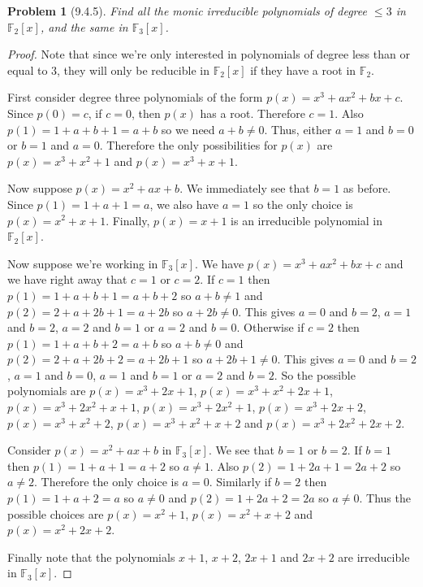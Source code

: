 \documentclass{article}
\newtheorem{problem}{Problem}
\begin{document}
\begin{problem}[9.4.5]
\label{finite}
Find all the monic irreducible polynomials of degree $\leq 3$ in $\mathbb{F}_2[x]$, and the same in $\mathbb{F}_3[x]$.
\end{problem}
\begin{proof}
Note that since we're only interested in polynomials of degree less than or equal to $3$, they will only be reducible in $\mathbb{F}_2[x]$ if they have a root in $\mathbb{F}_2$.

First consider degree three polynomials of the form $p(x) = x^3 + ax^2 + bx + c$. Since $p(0) = c$, if $c = 0$, then $p(x)$ has a root. Therefore $c = 1$. Also $p(1) = 1 + a + b + 1 = a + b$ so we need $a + b \neq 0$. Thus, either $a = 1$ and $b = 0$ or $b = 1$ and $a = 0$. Therefore the only possibilities for $p(x)$ are $p(x) = x^3 + x^2 + 1$ and $p(x) = x^3 + x + 1$.

Now suppose $p(x) = x^2 + ax + b$. We immediately see that $b = 1$ as before. Since $p(1) = 1 + a + 1 = a$, we also have $a = 1$ so the only choice is $p(x) = x^2 + x + 1$. Finally, $p(x) = x + 1$ is an irreducible polynomial in $\mathbb{F}_2[x]$.

Now suppose we're working in $\mathbb{F}_3[x]$. We have $p(x) = x^3 + ax^2 + bx + c$ and we have right away that $c = 1$ or $c = 2$. If $c = 1$ then $p(1) = 1 + a + b + 1 = a + b + 2$ so $a + b \neq 1$ and $p(2) = 2 + a + 2b + 1 = a + 2b$ so $a + 2b \neq 0$. This gives $a = 0$ and $b = 2$, $a = 1$ and $b = 2$, $a = 2$ and $b = 1$ or $a = 2$ and $b = 0$. Otherwise if $c = 2$ then $p(1) = 1 + a + b + 2 = a + b$ so $a + b \neq 0$ and $p(2) = 2 + a + 2b + 2 = a + 2b + 1$ so $a + 2b + 1 \neq 0$. This gives $a = 0$ and $b = 2$, $a = 1$ and $b = 0$, $a = 1$ and $b = 1$ or $a = 2$ and $b = 2$. So the possible polynomials are $p(x) = x^3 + 2x + 1$, $p(x) = x^3 + x^2 + 2x + 1$, $p(x) = x^3 + 2x^2 + x + 1$, $p(x) = x^3 + 2x^2 + 1$, $p(x) = x^3 + 2x + 2$, $p(x) = x^3 + x^2 + 2$, $p(x) = x^3 + x^2 + x + 2$ and $p(x) = x^3 + 2x^2 + 2x + 2$.

Consider $p(x) = x^2 + ax + b$ in $\mathbb{F}_3[x]$. We see that $b = 1$ or $b = 2$. If $b = 1$ then $p(1) = 1 + a + 1 = a + 2$ so $a \neq 1$. Also $p(2) = 1 + 2a + 1 = 2a + 2$ so $a \neq 2$. Therefore the only choice is $a = 0$. Similarly if $b = 2$ then $p(1) = 1 + a + 2 = a$ so $a \neq 0$ and $p(2) = 1 + 2a + 2 = 2a$ so $a \neq 0$. Thus the possible choices are $p(x) = x^2 + 1$, $p(x) = x^2 + x + 2$ and $p(x) = x^2 + 2x + 2$.

Finally note that the polynomials $x + 1$, $x + 2$, $2x + 1$ and $2x + 2$ are irreducible in $\mathbb{F}_3[x]$.
\end{proof}
\end{document}
